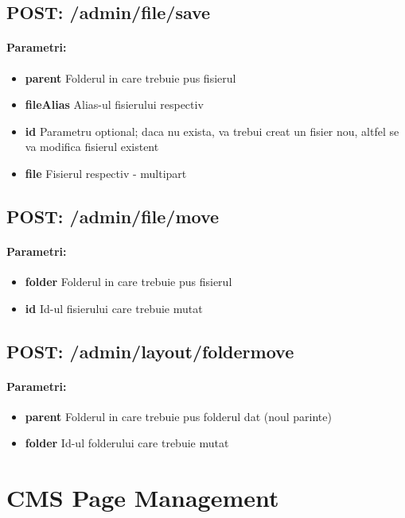  \subsection*{POST: /admin/file/save}

\paragraph{Parametri:}
\begin{itemize}
\item \textbf{parent}
 Folderul in care trebuie pus fisierul
\item \textbf{fileAlias}
 Alias-ul fisierului respectiv
\item \textbf{id}
 Parametru optional; daca nu exista, va trebui creat un fisier nou, altfel se va modifica fisierul existent
\item \textbf{file}
 Fisierul respectiv - multipart
 \end{itemize}
 \subsection*{POST: /admin/file/move}

\paragraph{Parametri:}
\begin{itemize}
\item \textbf{folder}
 Folderul in care trebuie pus fisierul
\item \textbf{id}
 Id-ul fisierului care trebuie mutat
 \end{itemize}
 \subsection*{POST: /admin/layout/foldermove}

\paragraph{Parametri:}
\begin{itemize}
\item \textbf{parent}
 Folderul in care trebuie pus folderul dat (noul parinte)
\item \textbf{folder}
 Id-ul folderului care trebuie mutat
 \end{itemize}
 

\section{CMS Page Management}

